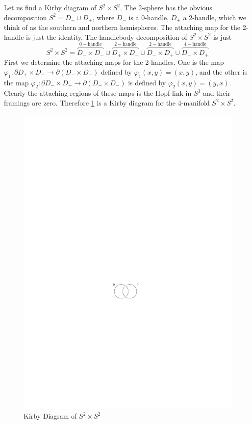 \begin{example}
Let us find a Kirby diagram of $S^2 \times S^2$. The 2-sphere has the obvious decomposition $S^2 = D_- \cup D_+$, where $D_-$ is a 0-handle, $D_+$ a 2-handle, which we think of as the southern and northern hemispheres. The attaching map for the 2-handle is just the identity. The handlebody decomposition of $S^2 \times S^2$ is just
\[ S^2 \times S^2 = \overbrace{D_- \times D_-}^{0-\text{handle}} \cup \overbrace{D_+ \times D_-}^{2-\text{handle}} \cup \overbrace{D_- \times D_+}^{2-\text{handle}} \cup \overbrace{D_+ \times D_+}^{4-\text{handle}} \]
First we determine the attaching maps for the 2-handles. One is the map $\varphi_1 : \partial D_+ \times D_- \rightarrow \partial(D_- \times D_-)$ defined by $\varphi_1(x,y)=(x,y)$, and the other is the map $\varphi_2 : \partial D_- \times D_+ \rightarrow \partial(D_-\times D_-)$ is defined by $\varphi_2(x,y)=(y,x)$. Clearly the attaching regions of these maps is the Hopf link in $S^3$ and their framings are zero. Therefore \cref{kirby-diagram-s2xs2} is a Kirby diagram for the 4-manifold $S^2 \times S^2$.

\begin{figure}[tb]
\centering
\includegraphics[scale=1]{graphics/kirby-diagram-s2xs2}
\caption{Kirby Diagram of $S^2 \times S^2$}
\label{kirby-diagram-s2xs2}
\end{figure}
\end{example}

